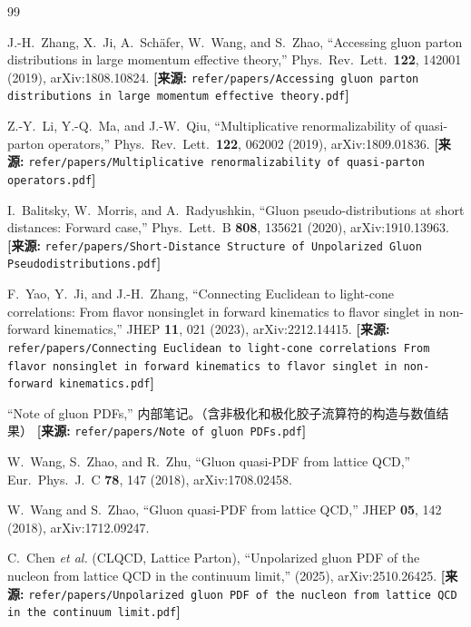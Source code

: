 \documentclass[12pt,a4paper]{ctexart}
\theoremstyle{definition}
\begin{document}
\begin{thebibliography}{99}

J.-H.~Zhang, X.~Ji, A.~Sch\"afer, W.~Wang, and S.~Zhao,
``Accessing gluon parton distributions in large momentum effective theory,''
Phys.\ Rev.\ Lett.\ \textbf{122}, 142001 (2019), arXiv:1808.10824.
\quad\textbf{[来源:} \texttt{refer/papers/Accessing gluon parton distributions in large momentum effective theory.pdf}\textbf{]}

Z.-Y.~Li, Y.-Q.~Ma, and J.-W.~Qiu,
``Multiplicative renormalizability of quasi-parton operators,''
Phys.\ Rev.\ Lett.\ \textbf{122}, 062002 (2019), arXiv:1809.01836.
\quad\textbf{[来源:} \texttt{refer/papers/Multiplicative renormalizability of quasi-parton operators.pdf}\textbf{]}

I.~Balitsky, W.~Morris, and A.~Radyushkin,
``Gluon pseudo-distributions at short distances: Forward case,''
Phys.\ Lett.\ B \textbf{808}, 135621 (2020), arXiv:1910.13963.
\quad\textbf{[来源:} \texttt{refer/papers/Short-Distance Structure of Unpolarized Gluon Pseudodistributions.pdf}\textbf{]}

F.~Yao, Y.~Ji, and J.-H.~Zhang,
``Connecting Euclidean to light-cone correlations: From flavor nonsinglet in forward kinematics to flavor singlet in non-forward kinematics,''
JHEP \textbf{11}, 021 (2023), arXiv:2212.14415.
\quad\textbf{[来源:} \texttt{refer/papers/Connecting Euclidean to light-cone correlations From flavor nonsinglet in forward kinematics to flavor singlet in non-forward kinematics.pdf}\textbf{]}

``Note of gluon PDFs,''
内部笔记。（含非极化和极化胶子流算符的构造与数值结果）
\quad\textbf{[来源:} \texttt{refer/papers/Note of gluon PDFs.pdf}\textbf{]}

W.~Wang, S.~Zhao, and R.~Zhu,
``Gluon quasi-PDF from lattice QCD,''
Eur.\ Phys.\ J.\ C \textbf{78}, 147 (2018), arXiv:1708.02458.

W.~Wang and S.~Zhao,
``Gluon quasi-PDF from lattice QCD,''
JHEP \textbf{05}, 142 (2018), arXiv:1712.09247.

C.~Chen \textit{et al.} (CLQCD, Lattice Parton),
``Unpolarized gluon PDF of the nucleon from lattice QCD in the continuum limit,''
(2025), arXiv:2510.26425.
\quad\textbf{[来源:} \texttt{refer/papers/Unpolarized gluon PDF of the nucleon from lattice QCD in the continuum limit.pdf}\textbf{]}


\end{thebibliography}
\end{document}
